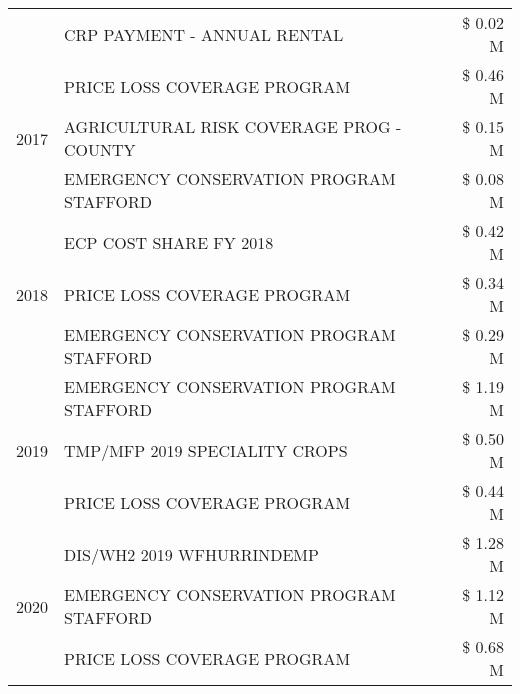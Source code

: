 \begin{tabular}{llr}
 & CRP PAYMENT - ANNUAL RENTAL                   & \$ 0.02 M \\
\cline{1-3}
\multirow[t]{3}{*}{2017} & PRICE LOSS COVERAGE PROGRAM & \$ 0.46 M \\
 & AGRICULTURAL RISK COVERAGE PROG - COUNTY & \$ 0.15 M \\
 & EMERGENCY CONSERVATION PROGRAM STAFFORD & \$ 0.08 M \\
\cline{1-3}
\multirow[t]{3}{*}{2018} & ECP COST SHARE FY 2018 & \$ 0.42 M \\
 & PRICE LOSS COVERAGE PROGRAM & \$ 0.34 M \\
 & EMERGENCY CONSERVATION PROGRAM STAFFORD & \$ 0.29 M \\
\cline{1-3}
\multirow[t]{3}{*}{2019} & EMERGENCY CONSERVATION PROGRAM STAFFORD & \$ 1.19 M \\
 & TMP/MFP 2019 SPECIALITY CROPS & \$ 0.50 M \\
 & PRICE LOSS COVERAGE PROGRAM & \$ 0.44 M \\
\cline{1-3}
\multirow[t]{3}{*}{2020} & DIS/WH2 2019 WFHURRINDEMP & \$ 1.28 M \\
 & EMERGENCY CONSERVATION PROGRAM STAFFORD & \$ 1.12 M \\
 & PRICE LOSS COVERAGE PROGRAM & \$ 0.68 M \\
\cline{1-3}
\bottomrule
\end{tabular}
